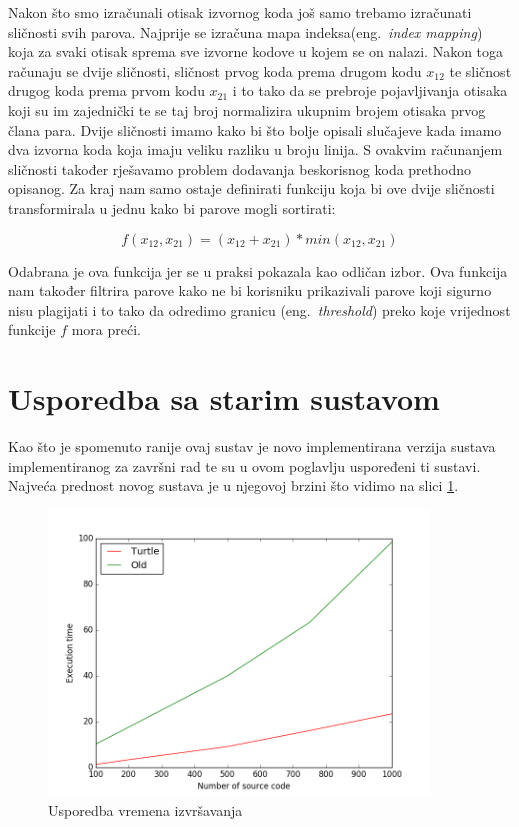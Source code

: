 Nakon što smo izračunali otisak izvornog koda još samo trebamo izračunati sličnosti svih parova. Najprije se izračuna mapa indeksa(eng.~\textit{index mapping}) koja za svaki otisak sprema sve izvorne kodove u kojem se on nalazi. Nakon toga računaju se dvije sličnosti, sličnost prvog koda prema drugom kodu $x_{12}$ te sličnost drugog koda prema prvom kodu $x_{21}$ i to tako da se prebroje pojavljivanja otisaka koji su im zajednički te se taj broj normalizira ukupnim brojem otisaka prvog člana para. Dvije sličnosti imamo kako bi što bolje opisali slučajeve kada imamo dva izvorna koda koja imaju veliku razliku u broju linija. S ovakvim računanjem sličnosti također rješavamo problem dodavanja beskorisnog koda prethodno opisanog.  Za kraj nam samo ostaje definirati funkciju koja bi ove dvije sličnosti transformirala u jednu kako bi parove mogli sortirati: 

\begin{equation}
	f(x_{12}, x_{21}) = (x_{12} + x_{21}) * min(x_{12}, x_{21})
\end{equation}

\noindent Odabrana je ova funkcija jer se u praksi pokazala kao odličan izbor. Ova funkcija nam također filtrira parove kako ne bi korisniku prikazivali parove koji sigurno nisu plagijati i to tako da odredimo granicu (eng.~\textit{threshold}) preko koje vrijednost funkcije $f$ mora preći.

\section{Usporedba sa starim sustavom}

Kao što je spomenuto ranije ovaj sustav je novo implementirana verzija sustava implementiranog za završni rad te su u ovom poglavlju uspoređeni ti sustavi. Najveća prednost novog sustava je u njegovoj brzini što vidimo na slici \ref{fig:execution_time}.

\begin{figure}[htb]
	\centering
	\includegraphics[width=0.9\textwidth,keepaspectratio]{fig/execution_time.png}
	\caption{Usporedba vremena izvršavanja}
	\label{fig:execution_time}
\end{figure}

